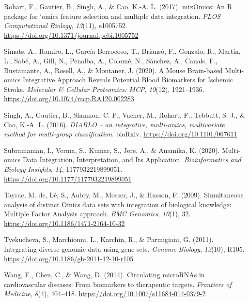 \documentclass[a4paper, nobind]{templates/ociamthesis}
\newlength{\cslhangindent}
\newenvironment{CSLReferences}[2] %
 {%
  \setlength{\parindent}{0pt}
  \ifodd #1
  \let\oldpar\par
  \def\par{\hangindent=\cslhangindent\oldpar}
  \fi
  \setlength{\parskip}{1mm}
  \setlength{\baselineskip}{6mm}
 }%
 {}
\begin{document}
\begin{CSLReferences}{1}{0}
\leavevmode{}%
Rohart, F., Gautier, B., Singh, A., \& Cao, K.-A. L. (2017). {mixOmics}: {An} {R} package for `omics feature selection and multiple data integration. \emph{PLOS Computational Biology}, \emph{13}(11), e1005752. \url{https://doi.org/10.1371/journal.pcbi.1005752}

\leavevmode{}%
Simats, A., Ramiro, L., García-Berrocoso, T., Briansó, F., Gonzalo, R., Martín, L., Sabé, A., Gill, N., Penalba, A., Colomé, N., Sánchez, A., Canals, F., Bustamante, A., Rosell, A., \& Montaner, J. (2020). A {Mouse} {Brain}-based {Multi}-omics {Integrative} {Approach} {Reveals} {Potential} {Blood} {Biomarkers} for {Ischemic} {Stroke}. \emph{Molecular \& Cellular Proteomics: MCP}, \emph{19}(12), 1921--1936. \url{https://doi.org/10.1074/mcp.RA120.002283}

\leavevmode{}%
Singh, A., Gautier, B., Shannon, C. P., Vacher, M., Rohart, F., Tebbutt, S. J., \& Cao, K.-A. L. (2016). \emph{{DIABLO} -- an integrative, multi-omics, multivariate method for multi-group classification}. bioRxiv. \url{https://doi.org/10.1101/067611}

\leavevmode{}%
Subramanian, I., Verma, S., Kumar, S., Jere, A., \& Anamika, K. (2020). Multi-omics {Data} {Integration}, {Interpretation}, and {Its} {Application}. \emph{Bioinformatics and Biology Insights}, \emph{14}, 1177932219899051. \url{https://doi.org/10.1177/1177932219899051}

\leavevmode{}%
Tayrac, M. de, Lê, S., Aubry, M., Mosser, J., \& Husson, F. (2009). Simultaneous analysis of distinct {Omics} data sets with integration of biological knowledge: {Multiple} {Factor} {Analysis} approach. \emph{BMC Genomics}, \emph{10}(1), 32. \url{https://doi.org/10.1186/1471-2164-10-32}

\leavevmode{}%
Tyekucheva, S., Marchionni, L., Karchin, R., \& Parmigiani, G. (2011). Integrating diverse genomic data using gene sets. \emph{Genome Biology}, \emph{12}(10), R105. \url{https://doi.org/10.1186/gb-2011-12-10-r105}

\leavevmode{}%
Wang, F., Chen, C., \& Wang, D. (2014). Circulating {microRNAs} in cardiovascular diseases: From biomarkers to therapeutic targets. \emph{Frontiers of Medicine}, \emph{8}(4), 404--418. \url{https://doi.org/10.1007/s11684-014-0379-2}


\end{CSLReferences}
\end{document}
